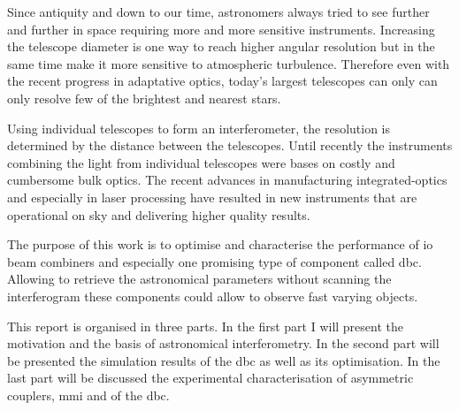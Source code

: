 Since antiquity and down to our time, astronomers always tried to see further and further in space requiring more and more sensitive instruments. Increasing the telescope diameter is one way to reach higher angular resolution but in the same time make it more sensitive to atmospheric turbulence. Therefore even with the recent progress in adaptative optics, today's largest telescopes can only can only resolve few of the brightest and nearest stars. 

Using individual telescopes to form an interferometer, the resolution is determined by the distance between the telescopes. Until recently the instruments combining the light from individual telescopes were bases on costly and cumbersome bulk optics. The recent advances in manufacturing integrated-optics and especially in laser processing have resulted in new instruments that are operational on sky and delivering higher quality results. 

The purpose of this work is to optimise and characterise the performance of \gls{io} beam combiners and especially one promising type of component called \gls{dbc}. Allowing to retrieve the astronomical parameters without scanning the interferogram these components could allow to observe fast varying objects. 

This report is organised in three parts. In the first part I will present the motivation and the basis of astronomical interferometry. In the second part will be presented the simulation results of the \gls{dbc} as well as its optimisation. In the last part will be discussed the experimental characterisation of asymmetric couplers, \gls{mmi} and of the \gls{dbc}.
